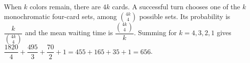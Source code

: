 When $k$ colors remain, there are $4k$ cards. A successful turn chooses one of the $k$ monochromatic four-card sets, among $\binom{4k}{4}$ possible sets. Its probability is $\dfrac{k}{\binom{4k}{4}}$ and the mean waiting time is $\dfrac{\binom{4k}{4}}{k}$. Summing for $k=4,3,2,1$ gives $\dfrac{1820}{4}+\dfrac{495}{3}+\dfrac{70}{2}+1=455+165+35+1=\boxed{656}$.
